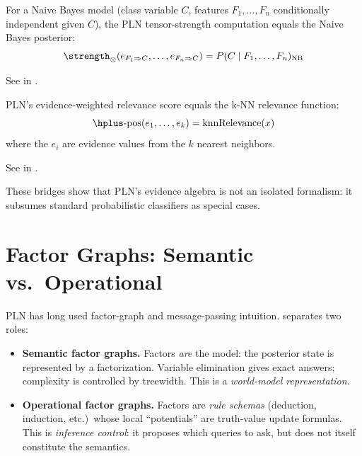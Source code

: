 \documentclass[11pt,openany]{report}
\begin{document}
\begin{theorem}
\label{thm:nb-bridge}
For a Naive Bayes model (class variable $C$, features $F_1, \ldots, F_n$
conditionally independent given $C$), the PLN tensor-strength computation
equals the Naive Bayes posterior:
\[
  \strength_{\otimes}(e_{F_1 \Rightarrow C}, \ldots, e_{F_n \Rightarrow C})
  = P(C \mid F_1, \ldots, F_n)_{\mathrm{NB}}
\]
\end{theorem}

See  in
.

\begin{theorem}
\label{thm:knn-bridge}
PLN's evidence-weighted relevance score equals the k-NN relevance
function:
\[
  \hplus\text{-}\mathrm{pos}(e_1, \ldots, e_k) = \mathrm{knnRelevance}(x)
\]
where the $e_i$ are evidence values from the $k$ nearest neighbors.
\end{theorem}

See  in
.

These bridges show that PLN's evidence algebra is not an isolated
formalism: it subsumes standard probabilistic classifiers as special
cases.

\section{Factor Graphs: Semantic vs.\ Operational}

PLN has long used factor-graph and message-passing intuition.  \xiPLN{}
separates two roles:

\begin{itemize}
\item \textbf{Semantic factor graphs.}  Factors \emph{are} the model:
  the posterior state is represented by a factorization.  Variable
  elimination gives exact answers; complexity is controlled by treewidth.
  This is a \emph{world-model representation}.

\item \textbf{Operational factor graphs.}  Factors are \emph{rule schemas}
  (deduction, induction, etc.)\ whose local ``potentials'' are truth-value
  update formulas.  This is \emph{inference control}: it proposes which
  queries to ask, but does not itself constitute the semantics.
\end{itemize}
\end{document}
